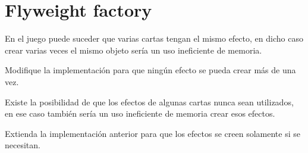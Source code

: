 \section{Flyweight factory}
  \begin{Exercise}[
    title={Eliminar la duplicación de objetos}, 
    label={ex:flyweight-1}, 
    difficulty=2
  ]
    En el juego puede suceder que varias cartas tengan el mismo efecto, en dicho caso 
    crear varias veces el mismo objeto sería un uso ineficiente de memoria.
    
    Modifique la implementación para que ningún efecto se pueda crear más de una vez.
  \end{Exercise}

  \begin{Exercise}[
    title={Inicialización \textit{lazy} de efectos (Propuesto)}, 
    label={ex:flyweight-2}, 
    difficulty=3
  ]
    Existe la posibilidad de que los efectos de algunas cartas nunca sean utilizados, en
    ese caso también sería un uso ineficiente de memoria crear esos efectos.

    Extienda la implementación anterior para que los efectos se creen solamente si se 
    necesitan.
  \end{Exercise}
%